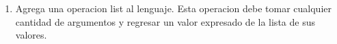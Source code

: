 \documentclass{article}
\begin{document}
\begin{enumerate}
\begin{itemize}
        \begin{align*}
            (\text{value-of}(\text{cdr-exp}& exp1) \rho ) \\
            =(\text{pair-val} (\text{cdr} (&\text{expval} \to \text{num} (\text{value-of} exp1 \rho))\\
        \end{align*}

        \begin{align*}
            (\text{value-of}(\text{null?-exp} \; & exp1) \; \rho ) \\
            =(\textbf{let} (&[val1 (\text{value-of} \; exp1 \; \rho)]) \\
                         & (\text{bool-val} (= \text{null-val} \; val1)))
        \end{align*}

        \begin{align*}
            (\text{value-of}(\text{emptylist}& exp1) \rho ) \\
            =(\text{null-val})\\
        \end{align*}
    \end{itemize}
    \item Agrega una operacion list al lenguaje. Esta operacion debe tomar cualquier cantidad de argumentos y regresar un valor expresado de la lista de sus valores.
    

\end{enumerate}
\end{document}
